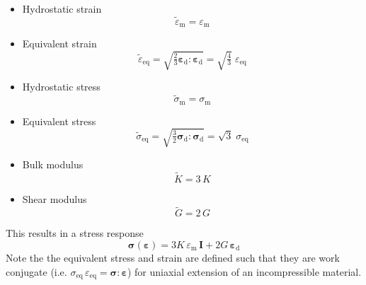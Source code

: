 \documentclass[times,namecite]{goose-article}
\begin{document}
\begin{itemize}
  \item Hydrostatic strain
  \begin{equation}
    \tilde{\varepsilon}_\mathrm{m} = \varepsilon_\mathrm{m}
  \end{equation}
  \item Equivalent strain
  \begin{equation}
    \tilde{\varepsilon}_\mathrm{eq}
    = \sqrt{\tfrac{2}{3} \bm{\varepsilon}_\mathrm{d} : \bm{\varepsilon}_\mathrm{d} }
    = \sqrt{\tfrac{4}{3}} \; \varepsilon_\mathrm{eq}
  \end{equation}
  \item Hydrostatic stress
  \begin{equation}
    \tilde{\sigma}_\mathrm{m} = \sigma_\mathrm{m}
  \end{equation}
  \item Equivalent stress
  \begin{equation}
    \tilde{\sigma}_\mathrm{eq}
    = \sqrt{\tfrac{3}{2} \bm{\sigma}_\mathrm{d} : \bm{\sigma}_\mathrm{d} }
    = \sqrt{3} \; \sigma_\mathrm{eq}
  \end{equation}
  \item Bulk modulus
  \begin{equation}
    \tilde{K} = 3 \, K
  \end{equation}
  \item Shear modulus
  \begin{equation}
    \tilde{G} = 2 \, G
  \end{equation}
\end{itemize}
This results in a stress response
\begin{equation}
  \bm{\sigma} ( \bm{\varepsilon} )
  =
  3 K \, \varepsilon_\mathrm{m} \, \bm{I}
  +
  2 G \, \bm{\varepsilon}_\mathrm{d}
\end{equation}
Note the the equivalent stress and strain are defined such that they are work conjugate (i.e. $\sigma_\mathrm{eq} \, \varepsilon_\mathrm{eq} = \bm{\sigma} : \bm{\varepsilon}$) for uniaxial extension of an incompressible material.


\end{document}

